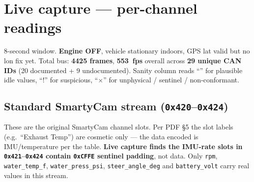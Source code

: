 \documentclass[11pt,a4paper]{article}
\newcommand{\ok}{\textcolor{ok}{\checkmark}}
\newcommand{\bad}{\textcolor{bad}{$\times$}}
\newcommand{\warnmark}{\textcolor{warn}{!}}
\newcommand{\hex}[1]{\texttt{0x#1}}
\begin{document}
\section{Live capture --- per-channel readings}

8-second window. \textbf{Engine OFF}, vehicle stationary indoors,
GPS lat valid but no lon fix yet. Total bus: \textbf{4425 frames},
\textbf{\SI{553}{fps}} overall across \textbf{29 unique CAN IDs}
(20 documented + 9 undocumented). Sanity column reads ``\ok'' for
plausible idle values, ``\warnmark'' for suspicious, ``\bad'' for
unphysical / sentinel / non-conformant.

\subsection{Standard SmartyCam stream (\hex{420}--\hex{424})}

These are the original SmartyCam channel slots. Per PDF \S 5 the
slot labels (e.g.\ ``Exhaust Temp'') are cosmetic only --- the data
encoded is IMU/temperature per the table. \textbf{Live capture finds
the IMU-rate slots in \hex{421}--\hex{424} contain \hex{CFFE}
sentinel padding}, not data. Only \texttt{rpm}, \texttt{water\_temp\_f},
\texttt{water\_press\_psi}, \texttt{steer\_angle\_deg} and
\texttt{battery\_volt} carry real values in this stream.
\end{document}
